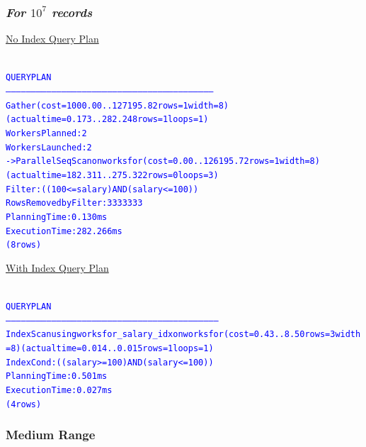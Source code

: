 \documentclass{article}
\begin{document}
    \subsubsection*{\emph{For $10^7$ records}}
    \underline{No Index Query Plan}
    \begin{center}
      {\tiny
      \begin{alltt}
      \textcolor{blue}{
        QUERY PLAN                                                        
        --------------------------------------------------------------------------------------------------------------------------
         Gather  (cost=1000.00..127195.82 rows=1 width=8) (actual time=0.173..282.248 rows=1 loops=1)
           Workers Planned: 2
           Workers Launched: 2
           ->  Parallel Seq Scan on worksfor  (cost=0.00..126195.72 rows=1 width=8) (actual time=182.311..275.322 rows=0 loops=3)
                 Filter: ((100 <= salary) AND (salary <= 100))
                 Rows Removed by Filter: 3333333
         Planning Time: 0.130 ms
         Execution Time: 282.266 ms
        (8 rows)
       }
      \end{alltt}
      }
    \end{center}
    \underline{With Index Query Plan}
    \begin{center}
      {\tiny
      \begin{alltt}
      \textcolor{blue}{
        QUERY PLAN                                                          
        ------------------------------------------------------------------------------------------------------------------------------
         Index Scan using worksfor_salary_idx on worksfor  (cost=0.43..8.50 rows=3 width=8) (actual time=0.014..0.015 rows=1 loops=1)
           Index Cond: ((salary >= 100) AND (salary <= 100))
         Planning Time: 0.501 ms
         Execution Time: 0.027 ms
        (4 rows)
       }
      \end{alltt}
      }
    \end{center}

    \subsubsection*{Medium Range}
\end{document}
